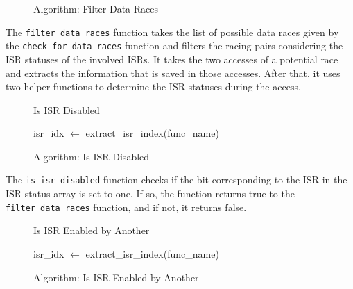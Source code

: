 \documentclass[
fancyheadings, %
%
%
]{stsreprt}
\begin{document}
{\begin{figure}[H]
\begin{algorithm}[H]
	\;
\end{algorithm}
\caption{Algorithm: Filter Data Races}
\end{figure}
\vspace{1cm}

The \texttt{filter\_data\_races} function takes the list of possible data races given by the \texttt{check\_for\_data\_races} function and filters the racing pairs considering the \ac{ISR} statuses of the involved \acp{ISR}. It takes the two accesses of a potential race and extracts the information that is saved in those accesses. After that, it uses two helper functions to determine the \ac{ISR} statuses during the access.


\begin{figure}[H]
	\centering
\begin{algorithm}[H]
	\caption{Is ISR Disabled}
	\DontPrintSemicolon
	\SetAlgoLined
	\BlankLine
	
	isr\_idx $\gets$ extract\_isr\_index(func\_name)\;
	\;
\end{algorithm}
\caption{Algorithm: Is \ac{ISR} Disabled}
\end{figure}
\vspace{1cm}

The \texttt{is\_isr\_disabled} function checks if the bit corresponding to the \ac{ISR} in the \Ac{ISR} status array is set to one. If so, the function returns true to the \texttt{filter\_data\_races} function, and if not, it returns false. 

\begin{figure}[H]
	\centering
\begin{algorithm}[H]
	\caption{Is ISR Enabled by Another}
	\DontPrintSemicolon
	\SetAlgoLined
	\BlankLine
	
	isr\_idx $\gets$ extract\_isr\_index(func\_name)\;
	\;
\end{algorithm}
\caption{Algorithm: Is \ac{ISR} Enabled by Another}
\end{figure}
\vspace{1cm}

}
\end{document}
